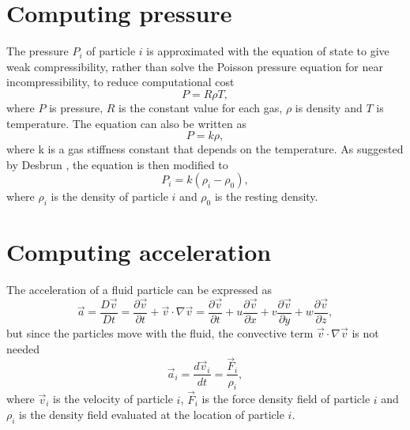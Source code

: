 \documentclass[a4paper, 12pt, oneside]{book}
\begin{document}
\section{Computing pressure}

\begin{doublespace}
    The pressure \(P_{i}\) of particle \(i\) is approximated with the equation of state to give weak compressibility, rather than solve the Poisson pressure equation for near incompressibility, to reduce computational cost 
    \begin{equation}
        P = R \rho T ,
    \end{equation}
    where \(P\) is pressure, \(R\) is the constant value for each gas, \(\rho\) is density and \(T\) is temperature. The equation can also be written as
    \begin{equation}
        P = k \rho ,
    \end{equation}
    where k is a gas stiffness constant that depends on the temperature. As suggested by Desbrun \cite{desbrun1996}, the equation is then modified to
    \begin{equation}
        P_i = k (\rho_i - \rho_0) ,
    \end{equation}
    where \(\rho_i\) is the density of particle \(i\) and \(\rho_0\) is the resting density.
\end{doublespace}

\section{Computing acceleration}

\begin{doublespace}
    The acceleration of a fluid particle can be expressed as
    \begin{equation}
        \vec{a} = \frac{D\vec{v}}{Dt} = \frac{\partial \vec{v}} {\partial t} + \vec{v} \cdot \nabla \vec{v} = \frac{\partial \vec{v}} {\partial t} + u \frac{\partial \vec{v}} {\partial x} + v \frac{\partial \vec{v}} {\partial y} + w \frac{\partial \vec{v}} {\partial z} ,
    \end{equation}
    but since the particles move with the fluid, the convective term \(\vec{v} \cdot \nabla \vec{v} \) is not needed
    \begin{equation}
        \vec{a}_{i} = \frac{d \vec{v}_{i}} {dt} = \frac{\vec{F}_{i}} {\rho_{i}} ,
    \end{equation}
    where \(\vec{v}_{i}\) is the velocity of particle \(i\), \(\vec{F}_i\) is the force density field of particle \(i\) and \(\rho_{i}\) is the density field evaluated at the location of particle \(i\).
\end{doublespace}
\end{document}
